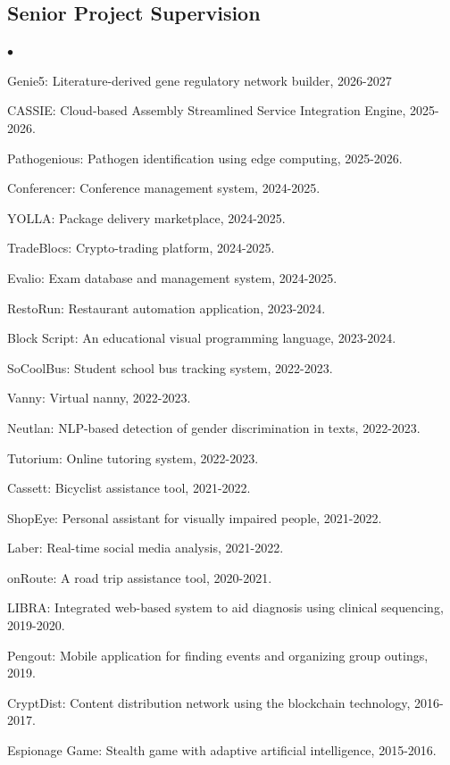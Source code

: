 \documentclass[margin,line]{res}
\newenvironment{list2}{
  \begin{list}{$\bullet$}{%
      \setlength{\itemsep}{0.1cm}
      \setlength{\parsep}{0in} \setlength{\parskip}{0in}
      \setlength{\topsep}{0in} \setlength{\partopsep}{0in} 
      \setlength{\leftmargin}{0.2in}}}{\end{list}}
\begin{document}
\begin{resume}
\vspace{-0.4cm}
\subsection{\small \sc Senior Project Supervision}
\begin{list2}
\item Genie5: Literature-derived gene regulatory network builder, 2026-2027
\item CASSIE: Cloud-based Assembly Streamlined Service Integration Engine, 2025-2026.
\item Pathogenious: Pathogen identification using edge computing, 2025-2026.
\item Conferencer: Conference management system, 2024-2025.
\item YOLLA: Package delivery marketplace, 2024-2025.
\item TradeBlocs: Crypto-trading platform, 2024-2025.
\item Evalio: Exam database and management system, 2024-2025.
\item RestoRun: Restaurant automation application, 2023-2024.
\item Block Script: An educational visual programming language, 2023-2024.
\item SoCoolBus:  Student school bus tracking system, 2022-2023.
\item Vanny: Virtual nanny, 2022-2023.
\item Neutlan: NLP-based detection of gender discrimination in texts, 2022-2023.
\item Tutorium: Online tutoring system, 2022-2023.
\item Cassett: Bicyclist assistance tool, 2021-2022.
\item ShopEye: Personal assistant for visually impaired people, 2021-2022.
\item Laber: Real-time social media analysis, 2021-2022.
\item onRoute: A road trip assistance tool, 2020-2021.
\item LIBRA: Integrated web-based system to aid diagnosis using clinical sequencing, 2019-2020.
\item Pengout: Mobile application for finding events and organizing group outings, 2019.
  \item CryptDist: Content distribution network using the blockchain technology, 2016-2017.
\item Espionage Game: Stealth game with adaptive artificial intelligence, 2015-2016.

\end{list2}
\end{resume}
\end{document}
